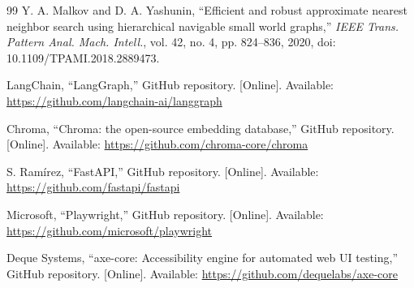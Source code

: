 \begin{thebibliography}{99}
Y. A. Malkov and D. A. Yashunin,
``Efficient and robust approximate nearest neighbor search using hierarchical navigable small world graphs,''
\textit{IEEE Trans. Pattern Anal. Mach. Intell.},
vol. 42, no. 4, pp. 824--836,
2020, doi: 10.1109/TPAMI.2018.2889473.

LangChain, ``LangGraph,'' GitHub repository. [Online]. Available: \url{https://github.com/langchain-ai/langgraph}

Chroma, ``Chroma: the open-source embedding database,'' GitHub repository. [Online]. Available: \url{https://github.com/chroma-core/chroma}

S. Ram\'irez, ``FastAPI,'' GitHub repository. [Online]. Available: \url{https://github.com/fastapi/fastapi}

Microsoft, ``Playwright,'' GitHub repository. [Online]. Available: \url{https://github.com/microsoft/playwright}

Deque Systems, ``axe-core: Accessibility engine for automated web UI testing,'' GitHub repository. [Online]. Available: \url{https://github.com/dequelabs/axe-core}

\end{thebibliography}
